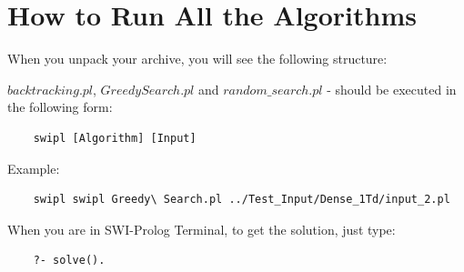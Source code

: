 \documentclass[a4apper,11pt]{article}
\begin{document}
\newpage
\appendix
\section{How to Run All the Algorithms}

When you unpack your archive, you will see the following structure:


$backtracking.pl$, $Greedy Search.pl$ and $random\_search.pl$ - should be executed in the following form:
\begin{lstlisting}
    swipl [Algorithm] [Input]
\end{lstlisting}

Example:
\begin{lstlisting}
    swipl swipl Greedy\ Search.pl ../Test_Input/Dense_1Td/input_2.pl 
\end{lstlisting}

When you are in SWI-Prolog Terminal, to get the solution, just type:

\begin{lstlisting}
    ?- solve().
\end{lstlisting}
\end{document}
